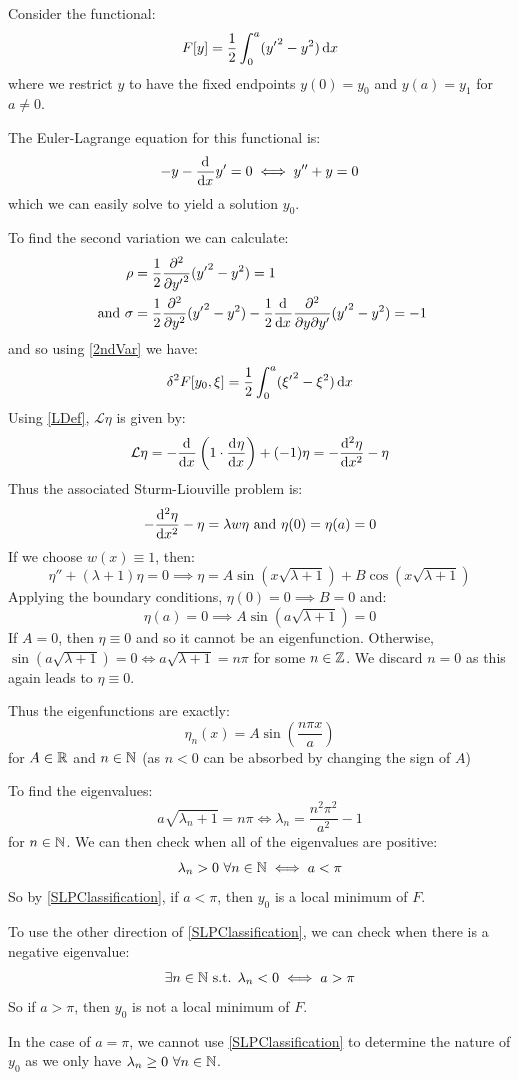 \documentclass[../main.tex]{subfiles}
\begin{document}
\begin{example}
  Consider the functional: \label{2ndVarExample}
  \[
    F[y] = \frac{1}{2} \int_{0}^{a} ({y'}^2 - y^2) \d{x}
  \]
  where we restrict $y$ to have the fixed endpoints $y(0) = y_0$ and $y(a) = y_1$ for $a \neq 0$.

  The Euler-Lagrange equation for this functional is:
  \[
    - y - \deriv{}{x} y' = 0 \iff y'' + y = 0
  \]
  which we can easily solve to yield a solution $y_0$.

  To find the second variation we can calculate:
  \begin{align*}
    \rho &= \frac{1}{2}\pderiv[2]{}{{y'}} ({y'}^2 - y^2) = 1 \\
    \text{ and } \sigma &= \frac{1}{2}\pderiv[2]{}{y}({y'}^2 - y^2) - \frac{1}{2}\deriv{}{x}\frac{\partial^2}{\partial y \partial y'}({y'}^2 - y^2) = -1
  \end{align*}
  and so using \cref{2ndVar} we have:
  \[
    \delta^2 F[y_0, \xi] = \frac{1}{2} \int_{0}^{a} ({\xi'}^2 - \xi^2) \d{x}
  \]
  Using \cref{LDef}, $\mathcal{L} \eta$ is given by:
  \[
    \mathcal{L} \eta = -\deriv{}{x}\left(1 \cdot \deriv{\eta}{x}\right) + (-1) \eta = -\deriv[2]{\eta}{x} - \eta
  \]
  Thus the associated Sturm-Liouville problem is:
  \[
    -\deriv[2]{\eta}{x} - \eta = \lambda w \eta \text{ and } \eta(0) = \eta(a) = 0
  \]
  If we choose $w(x) \equiv 1$, then:
  \[
    \eta'' + (\lambda + 1)\eta = 0 \implies \eta = A \sin(x\sqrt{\lambda + 1}) + B \cos(x\sqrt{\lambda + 1})
  \]
  Applying the boundary conditions, $\eta(0) = 0 \implies B = 0$ and:
  \[
    \eta(a) = 0 \implies A \sin(a \sqrt{\lambda + 1}) = 0
  \]
  If $A = 0$, then $\eta \equiv 0$ and so it cannot be an eigenfunction.
  Otherwise, $\sin(a \sqrt{\lambda + 1}) = 0 \iff a \sqrt{\lambda + 1} = n\pi$ for some $n \in \mathbb{Z}$.
  We discard $n = 0$ as this again leads to $\eta \equiv 0$.

  Thus the eigenfunctions are exactly:
  \[
    \eta_{n}(x) = A \sin \left(\frac{n \pi x}{a}\right)
  \]
  for $A \in \mathbb{R}$ and $n \in \mathbb{N}$ (as $n < 0$ can be absorbed by changing the sign of $A$)

  To find the eigenvalues:
  \[
    a \sqrt{\lambda_n + 1} = n \pi \iff \lambda_n = \frac{n^2 \pi^2}{a^2} - 1
  \]
  for $n \in \mathbb{N}$.
  We can then check when all of the eigenvalues are positive:
  \[
    \lambda_n > 0\ \forall n \in \mathbb{N} \iff a < \pi
  \]
  So by \cref{SLPClassification}, if $a < \pi$, then $y_0$ is a local minimum of $F$.

  To use the other direction of \cref{SLPClassification}, we can check when there is a negative eigenvalue:
  \[
    \exists n \in \mathbb{N} \text{ s.t. } \lambda_n < 0 \iff a > \pi
  \]
  So if $a > \pi$, then $y_0$ is not a local minimum of $F$.

  In the case of $a = \pi$, we cannot use \cref{SLPClassification} to determine the nature of $y_0$ as we only have $\lambda_n \geq 0\ \forall n \in \mathbb{N}$.
\end{example}
\end{document}
